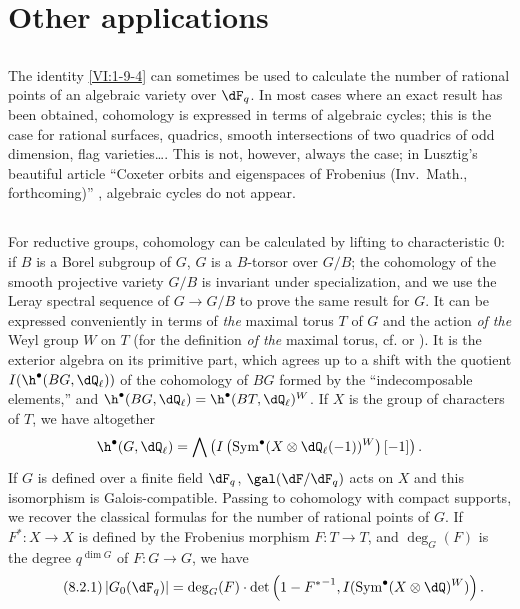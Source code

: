 \section{Other applications}\label{VI:8}





\subsection{}\label{VI:8-1}

The identity \ref{VI:1-9-4} can sometimes be used to calculate 
the number of rational points of an algebraic variety over $\dF_q$. In 
most cases where an exact result has been obtained, cohomology 
is expressed in terms of algebraic cycles; this is the case for rational 
surfaces, quadrics, smooth intersections of two quadrics of 
odd dimension, flag varieties\ldots. This is not, however, 
always the case; in Lusztig's beautiful article ``Coxeter orbits and eigenspaces of Frobenius (Inv.~Math., forthcoming)'' \cite{lu76}, algebraic cycles 
do not appear. 





\subsection{}\label{VI:8-2}

For reductive groups, cohomology can be calculated by lifting to 
characteristic $0$: if $B$ is a Borel subgroup of $G$, $G$ is a 
$B$-torsor over $G/B$; the cohomology of the smooth projective variety 
$G/B$ is invariant under specialization, and we use the Leray spectral sequence 
of $G\to G/B$ to prove the same result for $G$. It can be expressed 
conveniently in terms of \emph{the} maximal torus $T$ of $G$ and the action 
\emph{of the} Weyl group $W$ on $T$ (for the definition \emph{of the} maximal 
torus, cf. \cite[VIII \S 2 Rem.2]{bo05} or \cite[p.105]{dl76}). It is 
the exterior algebra on its primitive part, which agrees up to a shift 
with the quotient $I(\h^\bullet(B G,\dQ_\ell))$ of the cohomology of 
$B G$ formed by the ``indecomposable elements,'' and 
$\h^\bullet(B G,\dQ_\ell)=\h^\bullet(B T,\dQ_\ell)^W$. If $X$ is the group of 
characters of $T$, we have altogether 
\[
  \h^\bullet(G,\dQ_\ell) = \bigwedge \left(I\left(\operatorname{Sym}^\bullet(X\otimes \dQ_\ell(-1))^W\right)[-1]\right) \text{.}
\]
If $G$ is defined over a finite field $\dF_q$, $\gal(\dF/\dF_q)$ acts on $X$ 
and this isomorphism is Galois-compatible. Passing to 
cohomology with compact supports, we recover the classical formulas for the 
number of rational points of $G$. If $F^\ast:X\to X$ is defined by the 
Frobenius morphism $F:T\to T$, and $\deg_G(F)$ is the degree 
$q^{\dim G}$ of $F:G\to G$, we have 
\begin{equation*}\tag{8.2.1}\label{VI:eq:8-2-1}
  \left|G_0(\dF_q)\right| = \deg_G(F) \cdot \det\left(1-{F^\ast}^{-1},I(\operatorname{Sym}^\bullet(X\otimes \dQ)^W)\right) \text{.}
\end{equation*}

